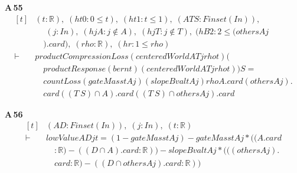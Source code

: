\noindent\textbf{A\,55}\quad{}
{\footnotesize\[ \begin{aligned}[t]
&(\mathit{t} : \mathbb{R} ),\; (\mathit{ht0} : 0 \leq \mathit{t}),\; (\mathit{ht1} : \mathit{t} \leq 1),\; (\mathit{A} \mathit{T} \mathit{S} : \mathit{Finset} (\mathit{I} \mathit{n})),\\
&\quad \; (\mathit{j} : \mathit{I} \mathit{n}),\; (\mathit{hjA} : \mathit{j} \notin \mathit{A}),\; (\mathit{hjT} : \mathit{j} \notin \mathit{T}),\; (\mathit{hB2} : 2 \leq (\mathit{others} \mathit{A} \mathit{j}\\
&\quad ).\mathit{card}),\; (\mathit{rho} : \mathbb{R} ),\; (\mathit{hr} : 1 \leq \mathit{rho})\\
\vdash\;&\mathit{productCompressionLoss} (\mathit{centeredWorld} \mathit{A} \mathit{T} \mathit{j} \mathit{rho} \mathit{t}) (\\
&\quad \mathit{productResponse} (\mathit{bern} \mathit{t}) (\mathit{centeredWorld} \mathit{A} \mathit{T} \mathit{j} \mathit{rho} \mathit{t})) \mathit{S} =\\
&\quad \mathit{countLoss} (\mathit{gateMass} \mathit{t} \mathit{A} \mathit{j}) (\mathit{slopeBval} \mathit{t} \mathit{A} \mathit{j}) \mathit{rho} \mathit{A}.\mathit{card} (\mathit{others} \mathit{A} \mathit{j}).\\
&\quad \mathit{card} ((\mathit{T} \ \mathit{S}) \cap \mathit{A}).\mathit{card} ((\mathit{T} \ \mathit{S}) \cap \mathit{others} \mathit{A} \mathit{j}).\mathit{card}
\end{aligned} \]}

\noindent\textbf{A\,56}\quad{}
{\footnotesize\[ \begin{aligned}[t]
&(\mathit{A} \mathit{D} : \mathit{Finset} (\mathit{I} \mathit{n})),\; (\mathit{j} : \mathit{I} \mathit{n}),\; (\mathit{t} : \mathbb{R} )\\
\vdash\;&\mathit{lowValue} \mathit{A} \mathit{D} \mathit{j} \mathit{t} = (1-\mathit{gateMass} \mathit{t} \mathit{A} \mathit{j}) -\mathit{gateMass} \mathit{t} \mathit{A} \mathit{j}*((\mathit{A}.\mathit{card}\\
&\quad :\mathbb{R} )-((\mathit{D} \cap \mathit{A}).\mathit{card}:\mathbb{R} )) -\mathit{slopeBval} \mathit{t} \mathit{A} \mathit{j}*(((\mathit{others} \mathit{A} \mathit{j}).\\
&\quad \mathit{card}:\mathbb{R} )-((\mathit{D} \cap \mathit{others} \mathit{A} \mathit{j}).\mathit{card}:\mathbb{R} ))
\end{aligned} \]}

